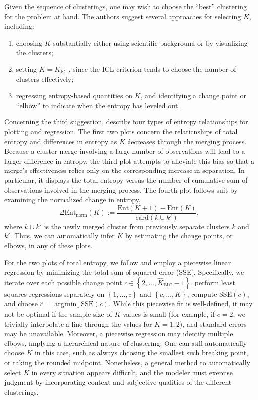 \documentclass{uwstat572}
\newcommand*\set[1]{\left\{#1\right\}}
\newcommand*\estim[1]{\widehat{#1}}
\DeclareMathOperator*{\argmin}{arg\;min}
\renewcommand\;{\,}
\begin{document}
Given the sequence of clusterings, one may wish to choose the ``best'' clustering for the problem at hand.
The authors suggest several approaches for selecting $K$, including:
\begin{enumerate}
\item
choosing $K$ substantially either using scientific background or by visualizing the clusters;
\item
setting $K = K_\text{ICL}$, since the ICL criterion tends to choose the number of clusters effectively;
\item
regressing entropy-based quantities on $K$, and identifying a change point or ``elbow'' to indicate when the entropy has leveled out.
\end{enumerate}
Concerning the third suggestion, \cite{Baudry10} describe four types of entropy relationships for plotting and regression.
The first two plots concern the relationships of total entropy and differences in entropy as $K$ decreases through the merging process.
Because a cluster merge involving a large number of observations will lead to a larger difference in entropy, the third plot attempts to alleviate this bias so that a merge's effectiveness relies only on the corresponding increase in separation.
In particular, it displays the total entropy versus the number of cumulative sum of observations involved in the merging process.
The fourth plot follows suit by examining the normalized change in entropy,
\begin{equation}
\Delta\text{Ent}_\text{norm}(K)
	:= \frac{ \text{Ent}(K + 1) - \text{Ent}(K) }{ \text{card}\left(k \cup k'\right) },
\end{equation}
where $k\cup k'$ is the newly merged cluster from previously separate clusters $k$ and $k'$.
Thus, we can automatically infer $K$ by estimating the change points, or elbows, in any of these plots.

For the two plots of total entropy, we follow \cite{Baudry10} and employ a piecewise linear regression by minimizing the total sum of squared error (SSE).
Specifically, we iterate over each possible change point $c \in \set{2, \dotsc, \estim K_\text{BIC} - 1}$, perform least squares regressions separately on $\set{1, \dotsc, c}$ and $\set{c, \dotsc, K}$, compute SSE$(c)$, and choose $\estim c = \argmin_c \text{SSE}(c)$.
While this piecewise fit is well-defined, it may not be optimal if the sample size of $K$-values is small (for example, if $c = 2$, we trivially interpolate a line through the values for $K = 1, 2$), and standard errors may be unavailable.
Moreover, a piecewise regression may identify multiple elbows, implying a hierarchical nature of clustering.
One can still automatically choose $K$ in this case, such as always choosing the smallest such breaking point, or taking the rounded midpoint.
Nonetheless, a general method to automatically select $K$ in every situation 	appears difficult, and the modeler must exercise judgment by incorporating context and subjective qualities of the different clusterings.
\end{document}
